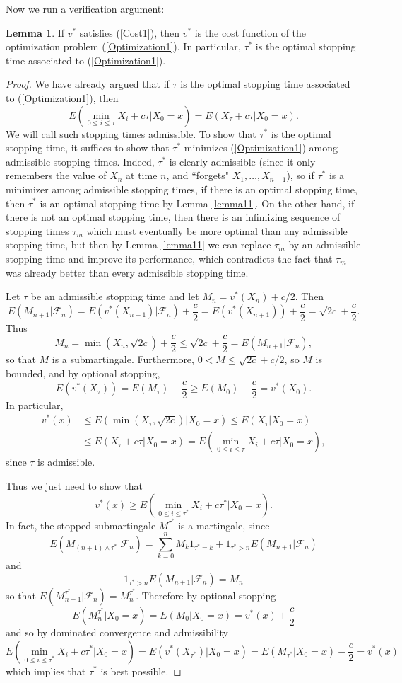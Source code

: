 \documentclass[10pt]{article}
\theoremstyle{definition}
\newtheorem{lemma}{Lemma}[exer]
\begin{document}
Now we run a verification argument:
\begin{lemma}
If $v^*$ satisfies (\ref{Cost1}), then $v^*$ is the cost function of the optimization problem (\ref{Optimization1}).
In particular, $\tau^*$ is the optimal stopping time associated to (\ref{Optimization1}).
\end{lemma}
\begin{proof}
We have already argued that if $\tau$ is the optimal stopping time associated to (\ref{Optimization1}), then
$$E\left(\min_{0 \leq i \leq \tau} X_i + c\tau\bigg| X_0 = x\right) = E(X_\tau + c\tau|X_0 = x).$$
We will call such stopping times admissible.
To show that $\tau^*$ is the optimal stopping time, it suffices to show that $\tau^*$ minimizes (\ref{Optimization1}) among admissible stopping times.
Indeed, $\tau^*$ is clearly admissible (since it only remembers the value of $X_n$ at time $n$, and ``forgets" $X_1, \dots, X_{n-1}$), so if $\tau^*$ is a minimizer among admissible
 stopping times, if there is an optimal stopping time, then $\tau^*$ is an optimal stopping time by Lemma \ref{lemma11}.
On the other hand, if there is not an optimal stopping time, then there is an infimizing sequence of stopping times $\tau_m$ which must eventually be more optimal than any admissible stopping time, but then by Lemma \ref{lemma11} we can replace $\tau_m$ by an admissible stopping time and improve its performance, which contradicts the fact that $\tau_m$ was already better than every admissible stopping time.

Let $\tau$ be an admissible stopping time and let $M_n = v^*(X_n) + c/2$. Then
$$E(M_{n+1}|\mathcal F_n) = E(v^*(X_{n+1})|\mathcal F_n) + \frac{c}{2} = E(v^*(X_{n + 1})) + \frac{c}{2} = \sqrt{2c} + \frac{c}{2}.$$
Thus
$$M_n = \min(X_n, \sqrt{2c}) + \frac{c}{2} \leq \sqrt{2c} + \frac{c}{2} = E(M_{n+1}|\mathcal F_n),$$
so that $M$ is a submartingale. Furthermore, $0 < M \leq \sqrt{2c} + c/2$, so $M$ is bounded, and by optional stopping,
$$E(v^*(X_\tau)) = E(M_\tau) - \frac{c}{2} \geq E(M_0) - \frac{c}{2} = v^*(X_0).$$
In particular,
\begin{align*}v^*(x)&\leq E(\min(X_\tau, \sqrt{2c})|X_0 = x) \leq E(X_\tau|X_0 = x) \\
&\leq E(X_\tau + c\tau|X_0 = x) = E\left(\min_{0 \leq i \leq \tau} X_i + c\tau\bigg| X_0 = x\right),
\end{align*}
since $\tau$ is admissible.

Thus we just need to show that
$$v^*(x) \geq E\left(\min_{0 \leq i \leq \tau^*} X_i + c\tau^*\bigg| X_0 = x\right).$$
In fact, the stopped submartingale $M^{\tau^*}$ is a martingale, since
$$E(M_{(n+1) \wedge \tau^*}|\mathcal F_n) = \sum_{k=0}^n M_k 1_{\tau^*=k} + 1_{\tau^* > n} E(M_{n+1}|\mathcal F_n)$$
and
$$1_{\tau^* > n} E(M_{n+1}|\mathcal F_n) = M_n$$
so that $E(M^{\tau^*}_{n+1}|\mathcal F_n) = M_n^{\tau^*}$.
Therefore by optional stopping
$$E(M_n^{\tau^*}|X_0 = x) = E(M_0|X_0 = x) = v^*(x) + \frac{c}{2}$$
and so by dominated convergence and admissibility
$$E\left(\min_{0 \leq i \leq \tau^*} X_i + c\tau^*\bigg| X_0 = x\right) = E(v^*(X_{\tau^*})|X_0 = x) = E(M_{\tau^*}|X_0 = x) - \frac{c}{2} = v^*(x)$$
which implies that $\tau^*$ is best possible.
\end{proof}
\end{document}
